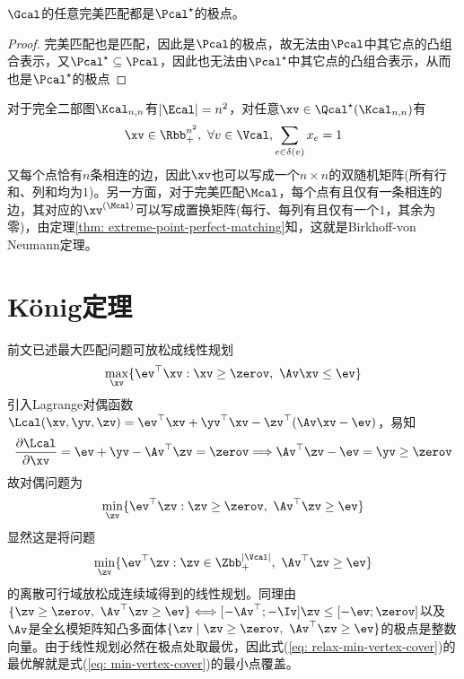 \documentclass{ctexart}
\begin{document}
\begin{theorem} \label{thm: extreme-point-perfect-matching}
    $\Gcal$的任意完美匹配都是$\Pcal^\star$的极点。
\end{theorem}

\begin{proof}
    完美匹配也是匹配，因此是$\Pcal$的极点，故无法由$\Pcal$中其它点的凸组合表示，又$\Pcal^\star \subseteq \Pcal$，因此也无法由$\Pcal^\star$中其它点的凸组合表示，从而也是$\Pcal^\star$的极点
\end{proof}

对于完全二部图$\Kcal_{n,n}$有$|\Ecal| = n^2$，对任意$\xv \in \Qcal^\star(\Kcal_{n,n})$有
\begin{align*}
    \xv \in \Rbb_+^{n^2}, ~ \forall v \in \Vcal, \sum_{e \in \delta(v)} x_e = 1
\end{align*}
又每个点恰有$n$条相连的边，因此$\xv$也可以写成一个$n \times n$的双随机矩阵(所有行和、列和均为$1$)。另一方面，对于完美匹配$\Mcal$，每个点有且仅有一条相连的边，其对应的$\xv^{(\Mcal)}$可以写成置换矩阵(每行、每列有且仅有一个$1$，其余为零)，由定理\ref{thm: extreme-point-perfect-matching}知，这就是Birkhoff-von Neumann定理。

\section{König定理}

前文已述最大匹配问题可放松成线性规划
\begin{align*}
    \max_{\xv} \{ \ev^\top \xv : \xv \ge \zerov, ~ \Av \xv \le \ev \}
\end{align*}
引入Lagrange对偶函数$\Lcal(\xv, \yv, \zv) = \ev^\top \xv + \yv^\top \xv - \zv^\top (\Av \xv - \ev)$，易知
\begin{align*}
    \frac{\partial \Lcal}{\partial \xv} = \ev + \yv - \Av^\top \zv = \zerov \Longrightarrow \Av^\top \zv - \ev = \yv \geq \zerov
\end{align*}
故对偶问题为
\begin{align} \label{eq: relax-min-vertex-cover}
    \min_{\zv} \{ \ev^\top \zv : \zv \ge \zerov, ~ \Av^\top \zv \ge \ev \}
\end{align}
显然这是将问题
\begin{align} \label{eq: min-vertex-cover}
    \min_{\zv} \{ \ev^\top \zv : \zv \in \Zbb_+^{|\Vcal|}, ~ \Av^\top \zv \ge \ev \}
\end{align}
的离散可行域放松成连续域得到的线性规划。同理由$\{ \zv \ge \zerov, ~ \Av^\top \zv \ge \ev \} \Longleftrightarrow [-\Av^\top; -\Iv] \zv \le [-\ev; \zerov]$以及$\Av$是全幺模矩阵知凸多面体$\{ \zv \mid \zv \ge \zerov, ~ \Av^\top \zv \ge \ev \}$的极点是整数向量。由于线性规划必然在极点处取最优，因此式(\ref{eq: relax-min-vertex-cover})的最优解就是式(\ref{eq: min-vertex-cover})的最小点覆盖。
\end{document}
